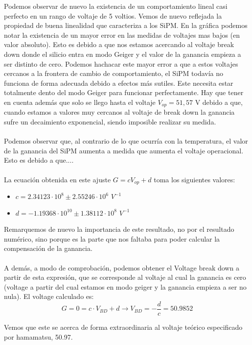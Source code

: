 \documentclass[11pt, a4paper]{article}
\begin{document}
\begin{itemize}
Podemos observar de nuevo la existencia de un comportamiento lineal casi perfecto en un rango de voltaje de 5 voltios. Vemos de nuevo reflejada la propiedad de buena linealidad que caracteriza a los SiPM. En la gráfica podemos notar la existencia de un mayor error en las medidas de voltajes mas bajos (en valor absoluto). Esto es debido a que nos estamos acercando al voltaje break down donde el silicio entra en modo Geiger y el valor de la ganancia empieza a ser distinto de cero. Podemos hachacar este mayor error a que a estos voltajes cercanos a la frontera de cambio de comportamiento, el SiPM todavía no funciona de forma adecuada debido a efectos más sutiles. Este necesita estar totalmente dento del modo Geiger para funcionar perfectamente. Hay que tener en cuenta además que solo se llego hasta el voltaje $V_{op}=51,57$ V debido a que, cuando estamos a valores muy cercanos al voltaje de break down la ganancia sufre un decaimiento exponencial, siendo imposible realizar su medida.

\paragraph {}
Podemos observar que, al contrario de lo que ocurría con la temperatura, el valor de la ganancia del SiPM aumenta a medida que aumenta el voltaje operacional. Esto es debido a que....

\paragraph {}
La ecuación obtenida en este ajuste $G=cV_{op}+d$ toma los siguientes valores: 
\begin{itemize}
\item{} $c=2.34123 \cdot 10^8 \pm 2.55246 \cdot 10^6$ $V^{-1}$
\item{} $d=-1.19368 \cdot 10^{10} \pm 1.38112 \cdot 10^8$ $V^{-1}$
\end{itemize}

Remarquemos de nuevo la importancia de este resultado, no por el resultado numérico, sino porque es la parte que nos faltaba para poder calcular la compensación de la ganancia.

\paragraph {}
A demás, a modo de comprobación, podemos obtener el Voltage break down a partir de esta expresión, que se corresponde al voltaje al cual la ganancia es cero (voltage a partir del cual estamos en modo geiger y la ganancia empieza a ser no nula). El voltage calculado es: 
$$G=0=c \cdot V_{BD} +d \longrightarrow V_{BD}=-\frac{d}{c}=50.9852$$

Vemos que este se acerca de forma extraordinaria al voltaje teórico especificado por hamamatsu, 50.97.
\end{itemize}
	
\end{document}
